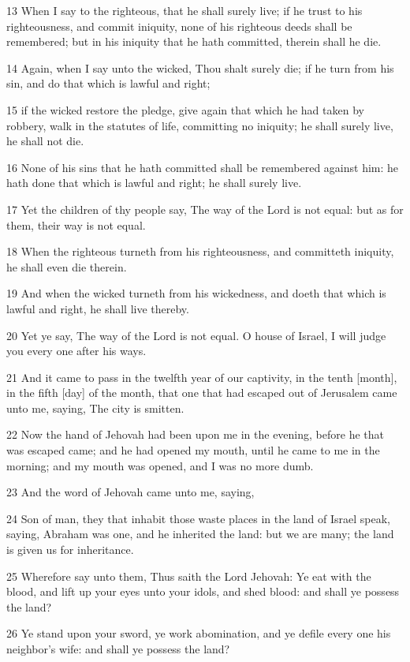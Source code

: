 \par 13 When I say to the righteous, that he shall surely live; if he trust to his righteousness, and commit iniquity, none of his righteous deeds shall be remembered; but in his iniquity that he hath committed, therein shall he die.
\par 14 Again, when I say unto the wicked, Thou shalt surely die; if he turn from his sin, and do that which is lawful and right;
\par 15 if the wicked restore the pledge, give again that which he had taken by robbery, walk in the statutes of life, committing no iniquity; he shall surely live, he shall not die.
\par 16 None of his sins that he hath committed shall be remembered against him: he hath done that which is lawful and right; he shall surely live.
\par 17 Yet the children of thy people say, The way of the Lord is not equal: but as for them, their way is not equal.
\par 18 When the righteous turneth from his righteousness, and committeth iniquity, he shall even die therein.
\par 19 And when the wicked turneth from his wickedness, and doeth that which is lawful and right, he shall live thereby.
\par 20 Yet ye say, The way of the Lord is not equal. O house of Israel, I will judge you every one after his ways.
\par 21 And it came to pass in the twelfth year of our captivity, in the tenth [month], in the fifth [day] of the month, that one that had escaped out of Jerusalem came unto me, saying, The city is smitten.
\par 22 Now the hand of Jehovah had been upon me in the evening, before he that was escaped came; and he had opened my mouth, until he came to me in the morning; and my mouth was opened, and I was no more dumb.
\par 23 And the word of Jehovah came unto me, saying,
\par 24 Son of man, they that inhabit those waste places in the land of Israel speak, saying, Abraham was one, and he inherited the land: but we are many; the land is given us for inheritance.
\par 25 Wherefore say unto them, Thus saith the Lord Jehovah: Ye eat with the blood, and lift up your eyes unto your idols, and shed blood: and shall ye possess the land?
\par 26 Ye stand upon your sword, ye work abomination, and ye defile every one his neighbor's wife: and shall ye possess the land?
